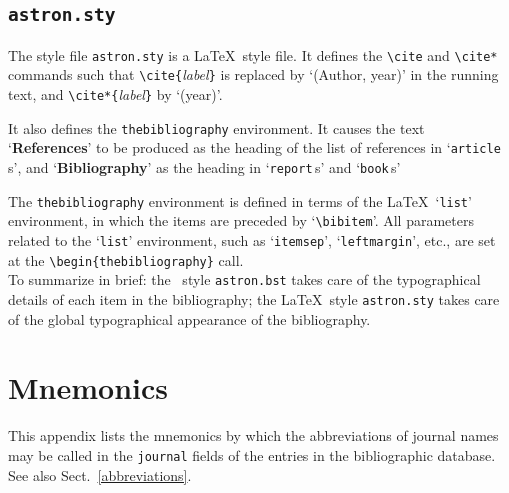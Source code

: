 \subsection{{\tt astron.sty}}

The style file {\tt astron.sty} is a \LaTeX\ style file.
It defines the \verb|\cite| and \verb|\cite*| commands such that
\verb|\cite{|{\it label\/}\verb|}| is replaced by `(Author, year)'
in the running text, and \verb|\cite*{|{\it label\/}\verb|}| by
`(year)'.

It also defines the {\tt thebibliography} environment.
It causes the text `{\bf References}' to be produced as the heading of
the list of references in `{\tt article}\,s', and `{\bf Bibliography}'
as the heading in `{\tt report}\,s' and `{\tt book}\,s'

The {\tt thebibliography} environment is defined in terms of the
\LaTeX\ `{\tt list}' environment, in which the items are preceded
by `\verb|\bibitem|'.
All parameters related to the `{\tt list}' environment, such as
`{\tt itemsep}', `{\tt leftmargin}', etc., are set at the
\verb|\begin{thebibliography}| call. \medskip \\
%
To summarize in brief: the \BibTeX\ style {\tt astron.bst} takes care
of the typographical details of each item in the bibliography;
the \LaTeX\ style {\tt astron.sty} takes care of the global 
typographical appearance of the bibliography.

\twocolumn
\section{Mnemonics}
\label{mnemonics}

This appendix lists the mnemonics by which the abbreviations of journal
names may be called in the {\tt journal} fields of the entries in the
bibliographic database.
See also Sect.~\ref{abbreviations}. \medskip \\


\newcommand{\printba}[2]{\noindent#2 \dotfill\ {\tt #1}\par}
\frenchspacing
\footnotesize

